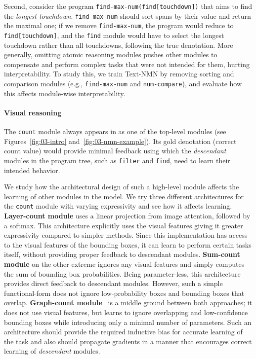 \documentclass[main.tex]{subfiles}
\begin{document}
Second, consider the program \texttt{find-max-num(find[\textrm{touchdown}])} that aims to find the \textit{longest touchdown}.
\texttt{find-max-num} should sort spans by their value and return the maximal one;
if we remove \texttt{find-max-num}, the program would reduce to \texttt{find[\textrm{touchdown}]},
and the \texttt{find} module would have to select the longest touchdown rather than all touchdowns, following the true denotation. More generally, omitting atomic reasoning modules pushes other modules to compensate and perform complex tasks that were not intended for them, hurting interpretability.
To study this, we train Text-NMN by removing sorting and comparison modules (e.g., \texttt{find-max-num} and \texttt{num-compare}), and evaluate how this affects module-wise interpretability.

\paragraph{Visual reasoning}
The \texttt{count} module always appears in \nlvr{} as one of the top-level modules (see Figures~\ref{fig:03-intro} and~\ref{fig:03-nmn-example}).
Its gold denotation (correct count value) would provide minimal feedback using which the \emph{descendant} modules in the program tree, such as \texttt{filter} and \texttt{find}, need to learn their intended behavior.

We study how the architectural design of such a high-level module affects the learning of other modules in the model. We try three different architectures for the \texttt{count} module with varying expressivity and see how it affects learning.
\textbf{Layer-count module} uses a linear projection from image attention, followed by a \textrm{softmax}. This architecture explicitly uses the visual features giving it greater expressivity compared to simpler methods. Since this implementation has access to the visual features of the bounding boxes, it can learn to perform certain tasks itself, without providing proper feedback to descendant modules.
\textbf{Sum-count module} on the other extreme ignores any visual features and simply computes the sum of bounding box probabilities. Being parameter-less, this architecture provides direct feedback to descendant modules. However, such a simple functional-form does not ignore low-probability boxes and bounding boxes that overlap.
\textbf{Graph-count module}~\cite{zhang-count-2018} is a middle ground between both approaches; it does not use visual features, but learns to ignore overlapping and low-confidence bounding boxes while introducing only a minimal number of parameters. Such an architecture should provide the required inductive bias for accurate learning of the task and also should propagate gradients in a manner that encourages correct learning of \emph{descendant} modules.
\end{document}
